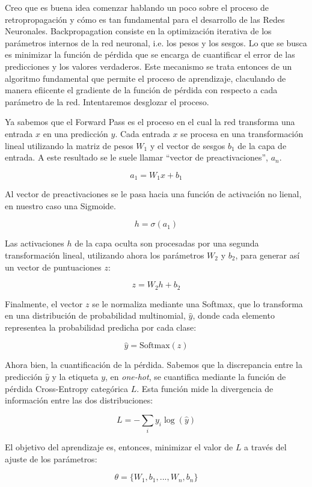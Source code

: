 Creo que es buena idea comenzar hablando un poco sobre el proceso de retropropagación y cómo es tan
fundamental para el desarrollo de las Redes Neuronales. Backpropagation consiste en la optimización
iterativa de los parámetros internos de la red neuronal, i.e. los pesos y los sesgos. Lo que se busca
es minimizar la función de pérdida que se encarga de cuantificar el error de las predicciones y los
valores verdaderos. Este mecanismo se trata entonces de un algoritmo fundamental que permite el proceso
de aprendizaje, claculando de manera efiicente el gradiente de la función de pérdida con respecto a cada
parámetro de la red. Intentaremos desglozar el proceso. 

Ya sabemos que el Forward Pass es el proceso en el cual la red transforma una entrada $x$ en una
predicción $y$. Cada entrada $x$ se procesa en una transformación lineal utilizando la matriz de pesos
$W_1$ y el vector de sesgos $b_1$ de la capa de entrada. A este resultado se le suele llamar ``vector de
preactivaciones'', $a_n$. 

\[
    a_1 = W_1 x + b_1
\]

Al vector de preactivaciones se le pasa hacia una función de activación no lienal, en nuestro caso una
Sigmoide.

\[
    h = \sigma(a_1)
\]

Las activaciones $h$ de la capa oculta son procesadas por una segunda transformación lineal, utilizando 
ahora los parámetros $W_2$ y $b_2$, para generar así un vector de puntuaciones $z$:

\[
    z = W_2 h + b_2
\]

Finalmente, el vector $z$ se le normaliza mediante una Softmax, que lo transforma en una distribución de 
probabilidad multinomial, $\hat{y}$, donde cada elemento representea la probabilidad predicha por cada clase:

\[
    \hat{y} = \text{Softmax}(z)
\]

Ahora bien, la cuantificación de la pérdida. Sabemos que la discrepancia entre la predicción $\hat{y}$ y la 
etiqueta $y$, en \textit{one-hot}, se cuantifica mediante la función de pérdida Cross-Entropy categórica $L$. 
Esta función mide la divergencia de información entre las dos distribuciones:

\[
    L = -\sum_{i} y_i \log (\hat{y})
\]

El objetivo del aprendizaje es, entonces, minimizar el valor de $L$ a través del ajuste de los parámetros:

\[
    \theta = \{W_1,b_1, ..., W_n, b_n\}
\]

